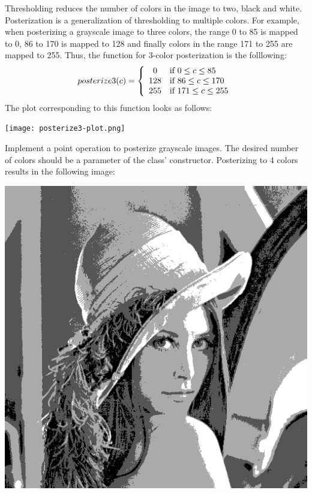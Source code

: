 \documentclass{book}
\begin{document}
\begin{exercise}
Thresholding reduces the number of colors in the image to two, black and white. Posterization is a generalization of thresholding to multiple colors. For example, when posterizing a grayscale image to three colors, the range 0 to 85 is mapped to 0, 86 to 170 is mapped to 128 and finally colors in the  range 171 to 255 are mapped to 255. Thus, the function for 3-color posterization is the folllowing:
 $$posterize3(c) = \left\{\begin{array}{c l}
  0 & \text{if $0 \leq c \leq 85$}\\
  128 & \text{if $86 \leq c \leq 170$}\\
  255 & \text{if $171 \leq c \leq 255$}\\
\end{array}
\right.$$
The plot corresponding to this function looks as follows:
\begin{center}
\texttt{[image: posterize3-plot.png]} 
\end{center}
Implement a point operation  to posterize grayscale images. The desired number of colors should be a parameter of the class' constructor. Posterizing  to 4 colors results in the following image:
\begin{center}
\includegraphics[scale=0.20]{lena-gray-posterized4.png}
\end{center}
\end{exercise}
\end{document}

